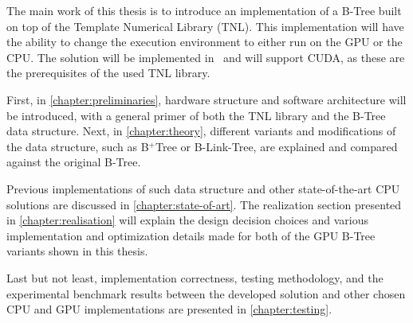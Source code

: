 The main work of this thesis is to introduce an implementation of a B-Tree built on top of the Template Numerical Library (TNL). This implementation will have the ability to change the execution environment to either run on the GPU or the CPU. The solution will be implemented in \CC\ and will support CUDA, as these are the prerequisites of the used TNL library.

First, in \cref{chapter:preliminaries}, hardware structure and software architecture will be introduced, with a general primer of both the TNL library and the B-Tree data structure. Next, in \cref{chapter:theory}, different variants and modifications of the data structure, such as B$^+$Tree or B-Link-Tree, are explained and compared against the original B-Tree.

Previous implementations of such data structure and other state-of-the-art CPU solutions are discussed in \cref{chapter:state-of-art}. The realization section presented in \cref{chapter:realisation} will explain the design decision choices and various implementation and optimization details made for both of the GPU B-Tree variants shown in this thesis.

Last but not least, implementation correctness, testing methodology, and the experimental benchmark results between the developed solution and other chosen CPU and GPU implementations are presented in \cref{chapter:testing}.